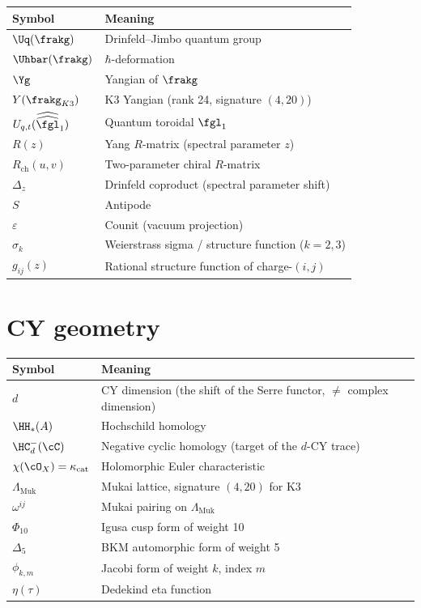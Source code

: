 \begin{center}
\begin{tabular}{@{}ll@{}}
\toprule
\textbf{Symbol} & \textbf{Meaning} \\
\midrule
$\Uq(\frakg)$ & Drinfeld--Jimbo quantum group \\
$\Uhbar(\frakg)$ & $\hbar$-deformation \\
$\Yg$ & Yangian of $\frakg$ \\
$Y(\frakg_{K3})$ & K3 Yangian (rank 24, signature $(4,20)$) \\
$U_{q,t}(\widehat{\widehat{\fgl}}_1)$ & Quantum toroidal $\fgl_1$ \\
$R(z)$ & Yang $R$-matrix (spectral parameter $z$) \\
$R_{\mathrm{ch}}(u,v)$ & Two-parameter chiral $R$-matrix \\
$\Delta_z$ & Drinfeld coproduct (spectral parameter shift) \\
$S$ & Antipode \\
$\varepsilon$ & Counit (vacuum projection) \\
$\sigma_k$ & Weierstrass sigma / structure function ($k = 2,3$) \\
$g_{ij}(z)$ & Rational structure function of charge-$(i,j)$ \\
\bottomrule
\end{tabular}
\end{center}

\section{CY geometry}
\label{sec:notation-cy}

\begin{center}
\begin{tabular}{@{}ll@{}}
\toprule
\textbf{Symbol} & \textbf{Meaning} \\
\midrule
$d$ & CY dimension (the shift of the Serre functor, $\neq$ complex dimension) \\
$\HH_*(A)$ & Hochschild homology \\
$\HC^-_d(\cC)$ & Negative cyclic homology (target of the $d$-CY trace) \\
$\chi(\cO_X) = \kappa_{\mathrm{cat}}$ & Holomorphic Euler characteristic \\
$\Lambda_{\mathrm{Muk}}$ & Mukai lattice, signature $(4,20)$ for K3 \\
$\omega^{ij}$ & Mukai pairing on $\Lambda_{\mathrm{Muk}}$ \\
$\Phi_{10}$ & Igusa cusp form of weight 10 \\
$\Delta_5$ & BKM automorphic form of weight 5 \\
$\phi_{k,m}$ & Jacobi form of weight $k$, index $m$ \\
$\eta(\tau)$ & Dedekind eta function \\
\bottomrule
\end{tabular}
\end{center}

